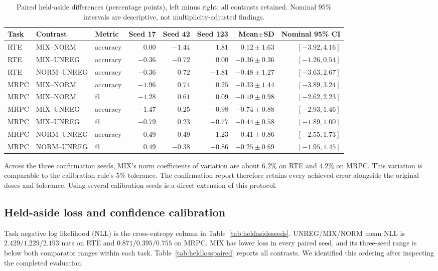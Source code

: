 \documentclass{article}
\begin{document}
\begin{table}[t]
\centering
\caption{Paired held-aside differences (percentage points), left minus right; all contrasts retained. Nominal 95\% intervals are descriptive, not multiplicity-adjusted findings.}
\label{tab:heldasidepaired}
\begin{adjustbox}{max width=\linewidth}
\begin{tabular}{lllrrrrr}
\toprule
Task & Contrast & Metric & Seed 17 & Seed 42 & Seed 123 & Mean$\pm$SD & Nominal 95\% CI\\
\midrule
RTE & MIX--NORM & accuracy & $0.00$ & $-1.44$ & $1.81$ & $0.12 \pm 1.63$ & $[-3.92,4.16]$ \\
RTE & MIX--UNREG & accuracy & $-0.36$ & $-0.72$ & $0.00$ & $-0.36 \pm 0.36$ & $[-1.26,0.54]$ \\
RTE & NORM--UNREG & accuracy & $-0.36$ & $0.72$ & $-1.81$ & $-0.48 \pm 1.27$ & $[-3.63,2.67]$ \\
MRPC & MIX--NORM & accuracy & $-1.96$ & $0.74$ & $0.25$ & $-0.33 \pm 1.44$ & $[-3.89,3.24]$ \\
MRPC & MIX--NORM & f1 & $-1.28$ & $0.61$ & $0.09$ & $-0.19 \pm 0.98$ & $[-2.62,2.23]$ \\
MRPC & MIX--UNREG & accuracy & $-1.47$ & $0.25$ & $-0.98$ & $-0.74 \pm 0.88$ & $[-2.93,1.46]$ \\
MRPC & MIX--UNREG & f1 & $-0.79$ & $0.23$ & $-0.77$ & $-0.44 \pm 0.58$ & $[-1.89,1.00]$ \\
MRPC & NORM--UNREG & accuracy & $0.49$ & $-0.49$ & $-1.23$ & $-0.41 \pm 0.86$ & $[-2.55,1.73]$ \\
MRPC & NORM--UNREG & f1 & $0.49$ & $-0.38$ & $-0.86$ & $-0.25 \pm 0.69$ & $[-1.95,1.45]$ \\
\bottomrule
\end{tabular}
\end{adjustbox}
\end{table}

Across the three confirmation seeds, MIX's norm coefficients of variation are about $6.2\%$ on RTE and $4.2\%$ on MRPC. This variation is comparable to the calibration rule's $5\%$ tolerance. The confirmation report therefore retains every achieved error alongside the original doses and tolerance. Using several calibration seeds is a direct extension of this protocol.

\subsection{Held-aside loss and confidence calibration}
\label{app:heldloss}
Task negative log likelihood (NLL) is the cross-entropy column in Table~\ref{tab:heldasideseeds}. UNREG/MIX/NORM mean NLL is $2.429/1.229/2.193$ nats on RTE and $0.871/0.395/0.755$ on MRPC. MIX has lower loss in every paired seed, and its three-seed range is below both comparator ranges within each task. Table~\ref{tab:heldlosspaired} reports all contrasts. We identified this ordering after inspecting the completed evaluation.
\end{document}
